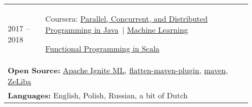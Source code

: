\documentclass{article}
\begin{document}
\begin{longtable}{p{0.00in}p{0.00in}p{0.0in}p{0.00in}p{0.00in}}
\multicolumn{2}{p{\dimexpr1.00in+2\tabcolsep\relax}}{2017 -- 2018} &
\multicolumn{3}{p{\dimexpr5.85in+4\tabcolsep\relax}}{Coursera:
\href{https://www.coursera.org/account/accomplishments/specialization/certificate/HEKRFB8RMKUD}{Parallel, Concurrent, and Distributed Programming in Java}\ $\vert$
    \href{https://www.coursera.org/account/accomplishments/verify/3YL6SFFSLZCT}{Machine Learning} \par
    \href{https://www.coursera.org/account/accomplishments/specialization/certificate/GAR3792UCR6W}{Functional Programming in Scala}
\par} \\

\multicolumn{5}{p{\dimexpr7.00in+8\tabcolsep\relax}}{
    \textbf{Open Source:}
    \href{https://github.com/apache/ignite/commits?author=dehasi}{Apache Ignite ML},
    \href{https://github.com/mojohaus/flatten-maven-plugin/commits?author=dehasi}{flatten-maven-plugin},
    \href{https://github.com/apache/maven/pull/347}{maven},
    \href{https://github.com/dehasi/zeliba}{ZeLiba}
\par} \\

\multicolumn{5}{p{\dimexpr7.00in+8\tabcolsep\relax}}{
    \textbf{Languages:} English, Polish, Russian, a bit of Dutch
} \\

\end{longtable}
\end{document}
